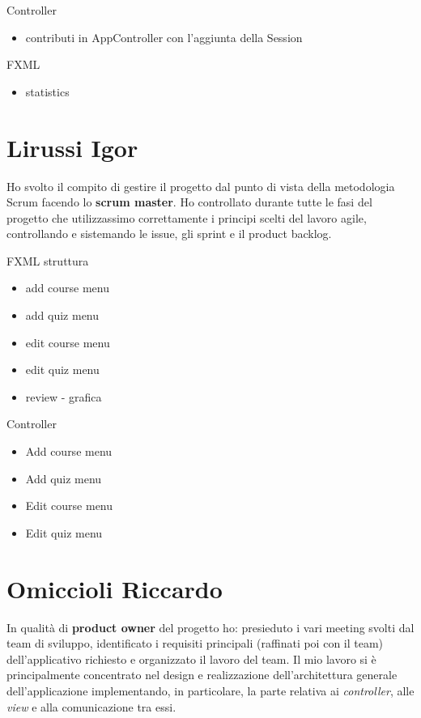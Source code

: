     Controller
    \begin{itemize}
        \item contributi in AppController con l'aggiunta della Session
    \end{itemize}

    FXML
    \begin{itemize}
        \item statistics
    \end{itemize}
    
\section{Lirussi Igor}
    Ho svolto il compito di gestire il progetto dal punto di vista della metodologia Scrum facendo lo \textbf{scrum master}. Ho controllato durante tutte le fasi del progetto che utilizzassimo correttamente i principi scelti del lavoro agile, controllando e sistemando le issue, gli sprint e il product backlog.

    FXML struttura
    \begin{itemize}
        \item add course menu
        \item add quiz menu
        \item edit course menu
        \item edit quiz menu
        \item review - grafica
    \end{itemize}

    Controller
    \begin{itemize}
        \item Add course menu
        \item Add quiz menu
        \item Edit course menu
        \item Edit quiz menu
    \end{itemize}
    
\section{Omiccioli Riccardo}
   In qualità di \textbf{product owner} del progetto ho: presieduto i vari meeting svolti dal team di sviluppo, identificato i requisiti principali (raffinati poi con il team) dell'applicativo richiesto e organizzato il lavoro del team. Il mio lavoro si è principalmente concentrato nel design e realizzazione dell'architettura generale dell'applicazione implementando, in particolare, la parte relativa ai \textit{controller}, alle \textit{view} e alla comunicazione tra essi.
   
